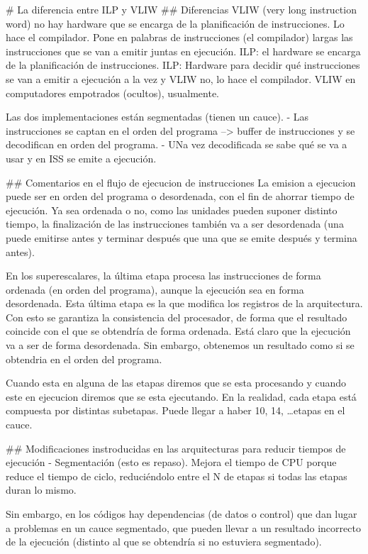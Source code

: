 # La diferencia entre ILP y VLIW 
## Diferencias
VLIW (very long instruction word) no hay hardware que se encarga de la planificación de instrucciones. Lo hace el compilador. Pone en palabras de instrucciones (el compilador) largas las instrucciones que se van a emitir juntas en ejecución.
ILP: el hardware se encarga de la planificación de instrucciones. 
ILP: Hardware para decidir qué instrucciones se van a emitir a ejecución a la vez y VLIW no, lo hace el compilador.
VLIW en computadores empotrados (ocultos), usualmente.

Las dos implementaciones están segmentadas (tienen un cauce).
- Las instrucciones se captan en el orden del programa --> buffer de instrucciones y se decodifican en orden del programa.
- UNa vez decodificada se sabe qué se va a usar y en ISS se emite a ejecución.

## Comentarios en el flujo de ejecucion de instrucciones
La emision a ejecucion puede ser en orden del programa o desordenada, con el fin de ahorrar tiempo de ejecución.
Ya sea ordenada o no, como las unidades pueden suponer distinto tiempo, la finalización de las instrucciones también va a ser desordenada (una puede emitirse antes y terminar después que una que se emite después y termina antes).

En los superescalares, la última etapa procesa las instrucciones de forma ordenada (en orden del programa), aunque la ejecución sea en forma desordenada.
Esta última etapa es la que modifica los registros de la arquitectura. Con esto se garantiza la consistencia del procesador, de forma que el resultado coincide con el que se obtendría de forma ordenada. Está claro que la ejecución va a ser de forma desordenada. Sin embargo, obtenemos un resultado como si se obtendria en el orden del programa.

Cuando esta en alguna de las etapas diremos que se esta procesando y cuando este en ejecucion diremos que se esta ejecutando.
En la realidad, cada etapa está compuesta por distintas subetapas. Puede llegar a haber 10, 14, \ldots etapas en el cauce.

## Modificaciones instroducidas en las arquitecturas para reducir tiempos de ejecución
- Segmentación (esto es repaso). Mejora el tiempo de CPU porque reduce el tiempo de ciclo, reduciéndolo entre el N de etapas si todas las etapas duran lo mismo.

Sin embargo, en los códigos hay dependencias (de datos o control) que dan lugar a problemas en un cauce segmentado, que pueden llevar a un resultado incorrecto de la ejecución (distinto al que se obtendría si no estuviera segmentado).

